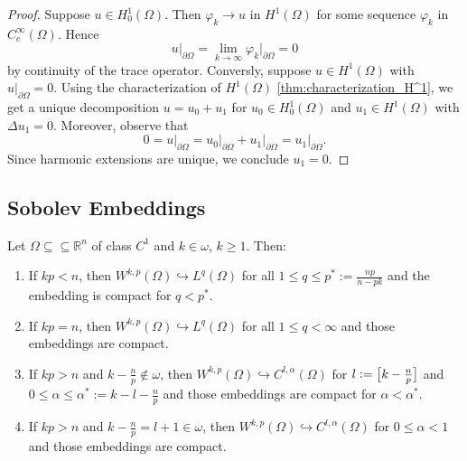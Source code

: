 \begin{proof}
	Suppose $u \in H^1_0(\Omega)$. Then $\varphi_k \to u$ in $H^1(\Omega)$ for some sequence $\varphi_k$ in $C^\infty_c(\Omega)$. Hence
	\begin{equation*}
		u\vert_{\partial \Omega} = \lim_{k \to \infty} \varphi_k\vert_{\partial\Omega} = 0
	\end{equation*}
	\noindent by continuity of the trace operator. Conversly, suppose $u \in H^1(\Omega)$ with $u\vert_{\partial \Omega} = 0$. Using the characterization of $H^1(\Omega)$ \ref{thm:characterization_H^1}, we get a unique decomposition $u = u_0 + u_1$ for $u_0 \in H^1_0(\Omega)$ and $u_1 \in H^1(\Omega)$ with $\Delta u_1 = 0$. Moreover, observe that
	\begin{equation*}
		0 = u\vert_{\partial \Omega} = u_0\vert_{\partial\Omega} + u_1\vert_{\partial \Omega} = u_1\vert_{\partial \Omega}.
	\end{equation*}
	Since harmonic extensions are unique, we conclude $u_1 = 0$.
\end{proof}



\subsection*{Sobolev Embeddings}

\begin{theorem}
	\label{thm:Sobolev_embedding_theorem}
	Let $\Omega \subseteq \subseteq \mathbb{R}^n$ of class $C^1$ and $k \in \omega$, $k \geq 1$. Then:
	\begin{enumerate}[label = \textup{(}\alph*\textup{)},wide = 0pt]
		\item If $kp < n$, then $W^{k,p}(\Omega) \hookrightarrow L^q(\Omega)$ for all $1 \leq q \leq p^* := \frac{np}{n - pk}$ and the embedding is compact for $q < p^*$.
		\item If $kp = n$, then $W^{k,p}(\Omega) \hookrightarrow L^q(\Omega)$ for all $1 \leq q < \infty$ and those embeddings are compact.
		\item If $kp > n$ and $k - \frac{n}{p} \notin \omega$, then $W^{k,p}(\Omega) \hookrightarrow C^{l,\alpha}(\Omega)$ for $l := \sbr[1]{k - \frac{n}{p}}$ and $0 \leq \alpha \leq \alpha^* := k - l - \frac{n}{p}$ and those embeddings are compact for $\alpha < \alpha^*$.
		\item If $kp > n$ and $k - \frac{n}{p} = l + 1 \in \omega$, then $W^{k,p}(\Omega) \hookrightarrow C^{l,\alpha}(\Omega)$ for $0 \leq \alpha < 1$ and those embeddings are compact.
	\end{enumerate}
\end{theorem}

